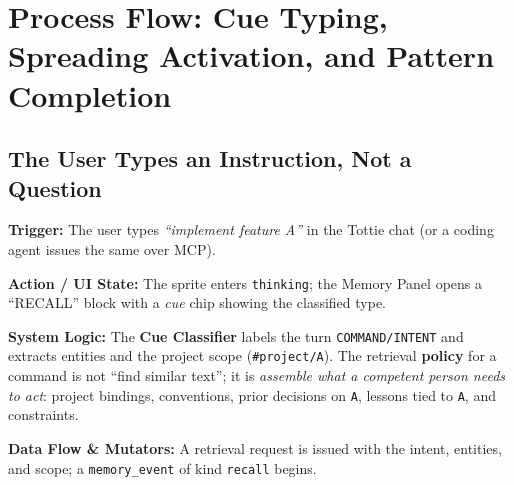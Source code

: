 \chapter{Process Flow: Cue Typing, Spreading Activation, and Pattern Completion}

\section{The User Types an Instruction, Not a Question}
\textbf{Trigger:} The user types \emph{``implement feature A''} in the Tottie chat (or a coding agent
issues the same over MCP).

\textbf{Action / UI State:} The sprite enters \texttt{thinking}; the Memory Panel opens a
``RECALL'' block with a \emph{cue} chip showing the classified type.

\textbf{System Logic:} The \textbf{Cue Classifier} labels the turn \texttt{COMMAND/INTENT} and extracts
entities and the project scope (\texttt{\#project/A}). The retrieval \textbf{policy} for a command is
not ``find similar text''; it is \emph{assemble what a competent person needs to act}: project
bindings, conventions, prior decisions on \texttt{A}, lessons tied to \texttt{A}, and constraints.

\textbf{Data Flow \& Mutators:} A retrieval request is issued with the intent, entities, and scope; a
\texttt{memory\_event} of kind \texttt{recall} begins.

